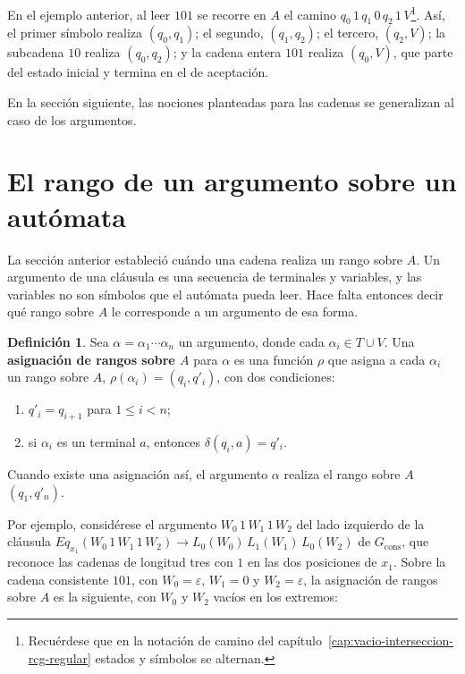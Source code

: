 \documentclass{report}
\theoremstyle{definition}
\newtheorem{definicion}{Definición}[chapter]
\theoremstyle{plain}
\begin{document}
En el ejemplo anterior, al leer $101$ se recorre en $A$ el camino
$q_0\,1\,q_1\,0\,q_2\,1\,V$\footnote{Recuérdese que en la notación de
camino del capítulo~\ref{cap:vacio-interseccion-rcg-regular} estados y
símbolos se alternan.}. Así, el primer símbolo realiza
$(q_0, q_1)$; el segundo, $(q_1, q_2)$; el tercero, $(q_2, V)$; la
subcadena $10$ realiza $(q_0, q_2)$; y la cadena entera $101$ realiza
$(q_0, V)$, que parte del estado inicial y termina en el de aceptación.

En la sección siguiente, las nociones planteadas para las cadenas se
generalizan al caso de los argumentos.

\section{El rango de un argumento sobre un autómata}\label{sec:rango-argumento}

La sección anterior estableció cuándo una cadena realiza un rango sobre
$A$. Un argumento de una cláusula es una secuencia de terminales y
variables, y las variables no son símbolos que el autómata pueda leer.
Hace falta entonces decir qué rango sobre $A$ le corresponde a un
argumento de esa forma.

\begin{definicion}
Sea $\alpha = \alpha_1 \cdots \alpha_n$ un argumento, donde cada
$\alpha_i \in T \cup V$. Una \textbf{asignación de rangos sobre $A$} para
$\alpha$ es una función $\rho$ que asigna a cada $\alpha_i$ un rango
sobre $A$, $\rho(\alpha_i) = (q_i, q'_i)$, con dos condiciones:
\begin{enumerate}
  \item $q'_i = q_{i+1}$ para $1 \le i < n$;
  \item si $\alpha_i$ es un terminal $a$, entonces $\delta(q_i, a) = q'_i$.
\end{enumerate}
Cuando existe una asignación así, el argumento $\alpha$ realiza
el rango sobre $A$ $(q_1, q'_n)$.
\end{definicion}

Por ejemplo, considérese el argumento $W_0\,1\,W_1\,1\,W_2$ del lado
izquierdo de la cláusula
$Eq_{x_1}(W_0\,1\,W_1\,1\,W_2) \to L_0(W_0)\,L_1(W_1)\,L_0(W_2)$ de
$G_{\mathrm{cons}}$, que reconoce las cadenas de longitud tres con $1$ en
las dos posiciones de $x_1$. Sobre la cadena consistente $101$, con
$W_0 = \varepsilon$, $W_1 = 0$ y $W_2 = \varepsilon$, la asignación de
rangos sobre $A$ es la siguiente, con $W_0$ y $W_2$ vacíos en los
extremos:
\end{document}
